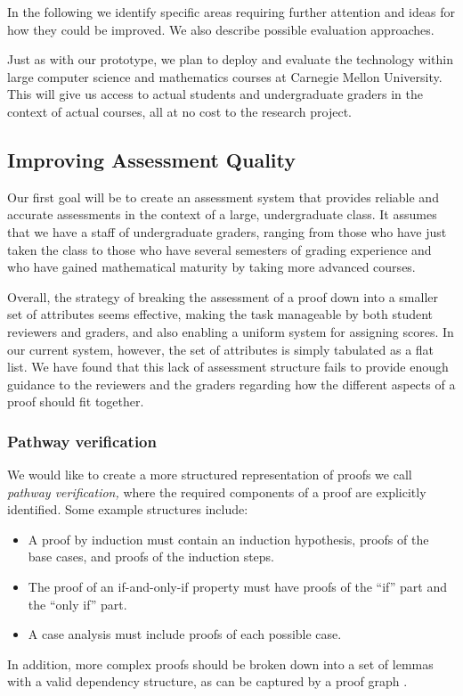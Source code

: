 \documentclass[12pt]{article}
\begin{document}
In the following we identify specific areas requiring further
attention and ideas for how they could be improved.  We also describe
possible evaluation approaches.

Just as with our prototype, we plan to deploy and evaluate
the technology within large computer science and
mathematics courses at Carnegie Mellon University.  This will give us
access to actual students and undergraduate graders in the context of
actual courses, all at no cost to the research project.

\subsection{Improving Assessment Quality}

Our first goal will be to create an assessment system that provides
reliable and accurate assessments in the context of a large,
undergraduate class.  It assumes that we have a staff of undergraduate
graders, ranging from those who have just taken the class to those who
have several semesters of grading experience and who have gained
mathematical maturity by taking more advanced courses.

Overall, the strategy of breaking the assessment of a proof down into a smaller
set of attributes seems effective, making the task manageable by
both student reviewers and graders, and also enabling a uniform
system for assigning scores.  In our current system, however, the set
of attributes is simply tabulated as a flat list.  We have found that
this lack of assessment structure fails to provide enough guidance to the
reviewers and the graders regarding how the different aspects of a
proof should fit together.

\subsubsection*{Pathway verification}

We would like to
create a more structured representation of proofs we call {\em pathway
  verification,}  where the required components of a proof are
explicitly identified.  Some example structures include:
\begin{itemize}
\item A proof by induction must contain an induction hypothesis,
  proofs of the base cases, and proofs of the induction steps.
\item The proof of an if-and-only-if property must have proofs of the
  ``if'' part and the ``only if'' part.
\item A case analysis must include proofs of each possible case.
\end{itemize}
In addition, more complex proofs should be broken down into a set of
lemmas with a valid dependency structure,
as can be captured by a proof graph \cite{anderson-science85}.
\end{document}
